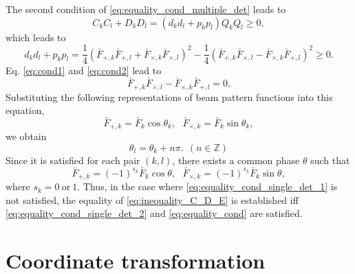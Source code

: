 \documentclass[12pt]{article}
\newcommand{\bFpk}{\bar{F}_{+, k}}
\newcommand{\bFck}{\bar{F}_{\times, k}}
\newcommand{\bFpl}{\bar{F}_{+, l}}
\newcommand{\bFcl}{\bar{F}_{\times, l}}
\newcommand{\bFk}{\bar{F}_k}
\begin{document}
The second condition of \eqref{eq:equality_cond_multiple_det} leads to
\begin{equation}
C_k C_l + D_k D_l = (d_k d_l + p_k p_l) Q_k Q_l \geq 0,
\end{equation}
which leads to
\begin{equation}
d_k d_l + p_k p_l = \frac{1}{4} \left(\bFpk \bFpl + \bFck \bFcl\right)^2 - \frac{1}{4} \left(\bFpk \bFcl - \bFck \bFpl\right)^2 \geq 0. \label{eq:cond2}
\end{equation}
Eq. \eqref{eq:cond1} and \eqref{eq:cond2} lead to
\begin{equation}
\bFpk \bFcl - \bFck \bFpl = 0.
\end{equation}
Substituting the following representations of beam pattern functions into this equation,
\begin{equation}
\bFpk = \bFk \cos \theta_k,~~~\bFck = \bFk \sin \theta_k,
\end{equation}
we obtain
\begin{equation}
\theta_l = \theta_k + n \pi.~~(n\in\mathbb{Z})
\end{equation}
Since it is satisfied for each pair $(k, l)$, there exists a common phase $\theta$ such that
\begin{equation}
\bFpk = (-1)^{s_k} \bFk \cos \theta,~~~\bFck = (-1)^{s_k} \bFk \sin \theta, \label{eq:equality_cond}
\end{equation}
where $s_k=0~\text{or}~1$.
Thus, in the case where \eqref{eq:equality_cond_single_det_1} is not satisfied, the equality of \eqref{eq:inequality_C_D_E} is established iff \eqref{eq:equality_cond_single_det_2} and \eqref{eq:equality_cond} are satisfied. 

\section{Coordinate transformation}
\end{document}
